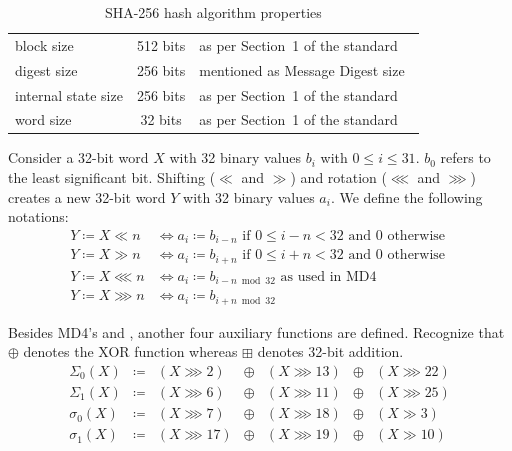 \begin{table}[!hb]
  \begin{center}
    \begin{tabular}{lcl}
      block size           & 512 bits   & as per Section~1 of the standard~\cite{fips-pub-180-4} \\
      digest size          & 256 bits   & mentioned as Message Digest size~\cite{fips-pub-180-4} \\
      internal state size  & 256 bits   & as per Section~1 of the standard~\cite{fips-pub-180-4} \\
      word size            & 32 bits    & as per Section~1 of the standard~\cite{fips-pub-180-4}
    \end{tabular}
    \caption{SHA-256 hash algorithm properties}
    \label{tab:sha256}
  \end{center}
\end{table}
%
\begin{defi}
  \label{def:shifts}
  Consider a 32-bit word $X$ with 32 binary values $b_i$ with $0 \leq i \leq 31$.
  $b_0$ refers to the least significant bit. Shifting ($≪$ and $≫$) and
  rotation ($⋘$ and $⋙$) creates a new 32-bit word $Y$ with 32 binary values $a_i$.
  We define the following notations:
  \begin{align*}
    Y \coloneqq X ≪ n  &\iff a_i \coloneqq b_{i-n} \text{ if } 0 \leq i-n < 32 \text{ and } 0 \text{ otherwise } \\
    Y \coloneqq X ≫ n  &\iff a_i \coloneqq b_{i+n} \text{ if } 0 \leq i+n < 32 \text{ and } 0 \text{ otherwise } \\
    Y \coloneqq X ⋘ n  &\iff a_i \coloneqq b_{i-n \bmod{32}} \text{ as used in MD4} \\
    Y \coloneqq X ⋙ n  &\iff a_i \coloneqq b_{i+n \bmod{32}}
  \end{align*}
\end{defi}
%
Besides MD4's  and ,
another four auxiliary functions are defined. Recognize that $\oplus$ denotes
the XOR function whereas $\boxplus$ denotes 32-bit addition.
\[
  \begin{array}{rcccccl}
    \Sigma_0(X) &\coloneqq& (X ⋙ 2) &\oplus& (X ⋙ 13) &\oplus& (X ⋙ 22) \\
    \Sigma_1(X) &\coloneqq& (X ⋙ 6) &\oplus& (X ⋙ 11) &\oplus& (X ⋙ 25) \\
    \sigma_0(X) &\coloneqq& (X ⋙ 7) &\oplus& (X ⋙ 18) &\oplus& (X ≫ 3) \\
    \sigma_1(X) &\coloneqq& (X ⋙ 17) &\oplus& (X ⋙ 19) &\oplus& (X ≫ 10)
  \end{array}
\]
